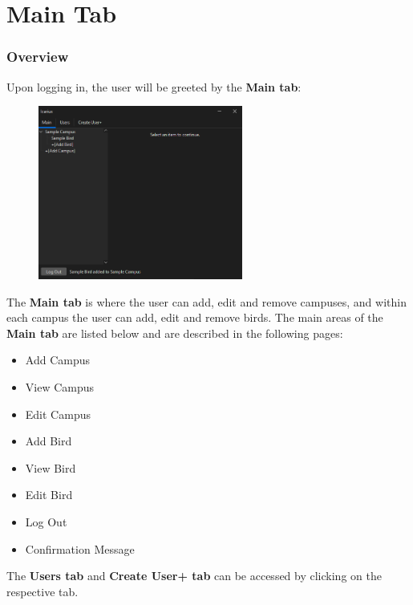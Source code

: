 \section{Main Tab}
\subsubsection{Overview}
Upon logging in, the user will be greeted by the \textbf{Main tab}: 
\begin{figure}[h]
    \centering
    \includegraphics[width=0.6\textwidth]{MainTab/mainTab.PNG}
\end{figure}

The \textbf{Main tab} is where the user can add, edit and remove campuses, and within each campus the user can add, edit and remove birds. The main areas of the \textbf{Main tab} are listed below and are described in the following pages:
\begin{itemize}
    \item Add Campus
    \item View Campus
    \item Edit Campus
    \item Add Bird
    \item View Bird
    \item Edit Bird
    \item Log Out
    \item Confirmation Message
\end{itemize}
The \textbf{Users tab} and \textbf{Create User+ tab} can be accessed by clicking on the respective tab.

